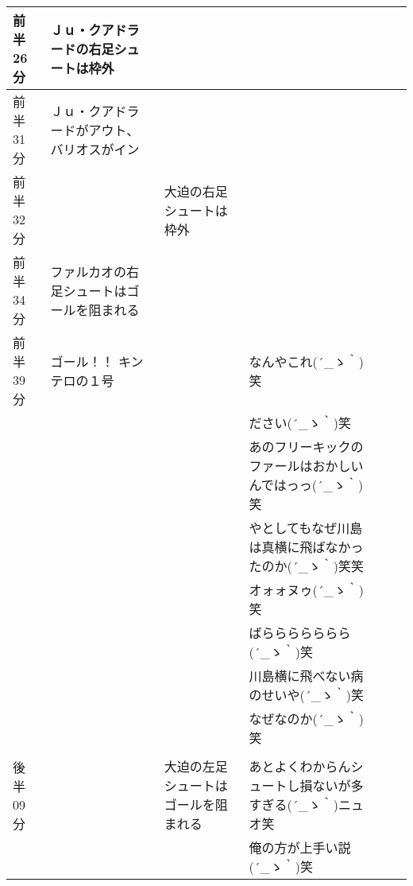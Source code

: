 \begin{table}[htb]
{\begin{tabular}{|l|l|l|l|l|l|}
      前半26分  & Ｊｕ・クアドラードの右足シュートは枠外       &                                       & \\ \hline
      前半31分  & Ｊｕ・クアドラードがアウト、バリオスがイン   &                                       & \\ \hline
      前半32分  &                                              & 大迫の右足シュートは枠外              & \\ \hline
      前半34分  & ファルカオの右足シュートはゴールを阻まれる   &                                       & \\ \hline
      前半39分  & ゴール！！ キンテロの１号                    &                                       & なんやこれ\sf (´\_ゝ｀)笑\\ \hline
                &                                              &                                       & ださい\sf (´\_ゝ｀)笑\\ \hline
                &                                              &                                       & あのフリーキックのファールはおかしいんではっっ\sf (´\_ゝ｀)笑\\ \hline
                &                                              &                                       & やとしてもなぜ川島は真横に飛ばなかったのか\sf (´\_ゝ｀)笑笑 \\ \hline
                &                                              &                                       & オォォヌゥ\sf (´\_ゝ｀)笑 \\ \hline
                &                                              &                                       & ばららららららら\sf (´\_ゝ｀)笑 \\ \hline
                &                                              &                                       & 川島横に飛べない病のせいや\sf (´\_ゝ｀)笑 \\ \hline
                &                                              &                                       & なぜなのか\sf (´\_ゝ｀)笑 \\ \hline
                &                                              &                                       &  \\ \hline
      後半09分  &                                              & 大迫の左足シュートはゴールを阻まれる  & あとよくわからんシュートし損ないが多すぎる\sf (´\_ゝ｀)ニュオ笑 \\ \hline
                &                                              &                                       & 俺の方が上手い説\sf (´\_ゝ｀)笑 \\ \hline

\end{tabular}}
\end{table}
